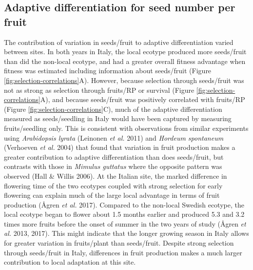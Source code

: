 \documentclass[]{article}
\begin{document}
\hypertarget{adaptive-differentiation-for-seed-number-per-fruit}{%
\subsection{Adaptive differentiation for seed number per fruit}\label{adaptive-differentiation-for-seed-number-per-fruit}}

The contribution of variation in seeds/fruit to adaptive differentiation varied between sites. In both years in Italy, the local ecotype produced more seeds/fruit than did the non-local ecotype, and had a greater overall fitness advantage when fitness was estimated including information about seeds/fruit (Figure \ref{fig:selection-correlations}A). However, because selection through seeds/fruit was not as strong as selection through fruits/RP or survival (Figure \ref{fig:selection-correlations}A), and because seeds/fruit was positively correlated with fruits/RP (Figure \ref{fig:selection-correlations}C), much of the adaptive differentiation measured as seeds/seedling in Italy would have been captured by measuring fruits/seedling only. This is consistent with observations from similar experiments using \emph{Arabidopsis lyrata} (Leinonen \emph{et al.} 2011) and \emph{Hordeum spontaneum} (Verhoeven \emph{et al.} 2004) that found that variation in fruit production makes a greater contribution to adaptive differentiation than does seeds/fruit, but contrasts with those in \emph{Mimulus guttatus} where the opposite pattern was observed (Hall \& Willis 2006). At the Italian site, the marked difference in flowering time of the two ecotypes coupled with strong selection for early flowering can explain much of the large local advantage in terms of fruit production (Ågren \emph{et al.} 2017). Compared to the non-local Swedish ecotype, the local ecotype began to flower about 1.5 months earlier and produced 5.3 and 3.2 times more fruits before the onset of summer in the two years of study (Ågren \emph{et al.} 2013, 2017). This might indicate that the longer growing season in Italy allows for greater variation in fruits/plant than seeds/fruit. Despite strong selection through seeds/fruit in Italy, differences in fruit production makes a much larger contribution to local adaptation at this site.
\end{document}
